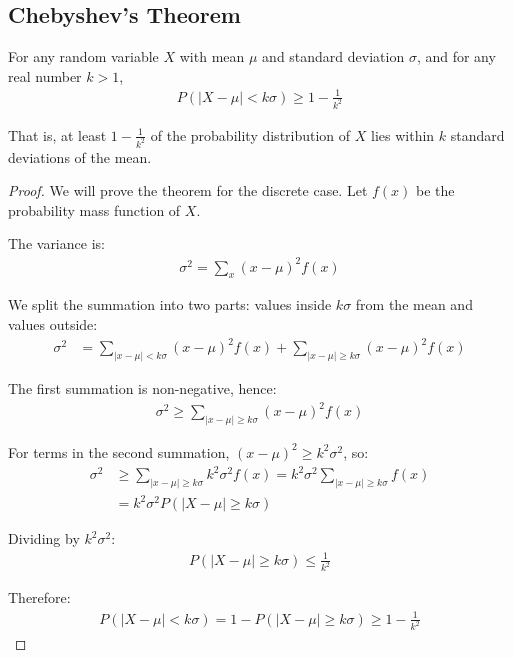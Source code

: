 \subsection{Chebyshev's Theorem}

\begin{theorem}[Chebyshev]
	For any random variable $X$ with mean $\mu$ and standard deviation $\sigma$, and for any real number $k > 1$,
	\begin{align}
		P(|X - \mu| < k\sigma) \geq 1 - \frac{1}{k^2}
	\end{align}
	
	That is, at least $1 - \frac{1}{k^2}$ of the probability distribution of $X$ lies within $k$ standard deviations of the mean.
\end{theorem}

\begin{proof}
	We will prove the theorem for the discrete case. Let $f(x)$ be the probability mass function of $X$.
	
	The variance is:
	\begin{align}
		\sigma^2 = \sum_{x} (x - \mu)^2 f(x)
	\end{align}
	
	We split the summation into two parts: values inside $k\sigma$ from the mean and values outside:
	\begin{align}
		\sigma^2 &= \sum_{|x-\mu| < k\sigma} (x-\mu)^2 f(x) + \sum_{|x-\mu| \geq k\sigma} (x-\mu)^2 f(x)
	\end{align}
	
	The first summation is non-negative, hence:
	\begin{align}
		\sigma^2 \geq \sum_{|x-\mu| \geq k\sigma} (x-\mu)^2 f(x)
	\end{align}
	
	For terms in the second summation, $(x-\mu)^2 \geq k^2\sigma^2$, so:
	\begin{align}
		\sigma^2 &\geq \sum_{|x-\mu| \geq k\sigma} k^2\sigma^2 f(x) = k^2\sigma^2 \sum_{|x-\mu| \geq k\sigma} f(x) \\
		&= k^2\sigma^2 P(|X-\mu| \geq k\sigma)
	\end{align}
	
	Dividing by $k^2\sigma^2$:
	\begin{align}
		P(|X-\mu| \geq k\sigma) \leq \frac{1}{k^2}
	\end{align}
	
	Therefore:
	\begin{align}
		P(|X-\mu| < k\sigma) = 1 - P(|X-\mu| \geq k\sigma) \geq 1 - \frac{1}{k^2}
	\end{align}
\end{proof}

